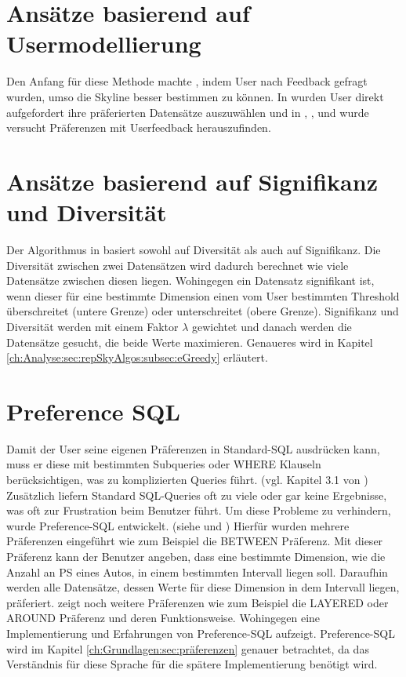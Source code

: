 \section{Ansätze basierend auf Usermodellierung}
\label{ch:Forschungsstand:sec:userModel}
Den Anfang für diese Methode machte \cite{948}, indem User nach Feedback gefragt wurden, umso die Skyline besser bestimmen zu können.
In \cite{Lofi10efficientcomputation} wurden User direkt aufgefordert ihre präferierten Datensätze auszuwählen und in \cite{lee2008optimal}, \cite{Mindolin:2009:DRI:1687627.1687697}, \cite{Mindolin:2011:PEP:1969331.1969354} und \cite{Zhao10callto} wurde versucht Präferenzen mit Userfeedback herauszufinden.
\section{Ansätze basierend auf Signifikanz und Diversität}
\label{ch:Forschungsstand:sec:userModel}
Der Algorithmus in \cite{magnani2014taking} basiert sowohl auf Diversität als auch auf Signifikanz. Die Diversität zwischen zwei Datensätzen wird dadurch berechnet wie viele Datensätze zwischen diesen liegen. Wohingegen ein Datensatz signifikant ist, wenn dieser für eine bestimmte Dimension einen vom User bestimmten Threshold überschreitet (untere Grenze) oder unterschreitet (obere Grenze).
Signifikanz und Diversität werden mit einem Faktor $\lambda$ gewichtet und danach werden die Datensätze gesucht, die beide Werte maximieren. Genaueres wird in Kapitel \ref{ch:Analyse:sec:repSkyAlgos:subsec:eGreedy} erläutert.
\section{Preference SQL}
\label{ch:Forschungsstand:sec:prefSQL}
Damit der User seine eigenen Präferenzen in Standard-SQL ausdrücken kann, muss er diese mit bestimmten Subqueries oder WHERE Klauseln berücksichtigen, was zu komplizierten Queries führt. (vgl. Kapitel 3.1 von \cite{borzsony2001skyline}) Zusätzlich liefern Standard SQL-Queries oft zu viele oder gar keine Ergebnisse, was oft zur Frustration beim Benutzer führt. Um diese Probleme zu verhindern, wurde Preference-SQL entwickelt. (siehe \cite{kiessling2002foundations} und \cite{kiessling2011preference}) Hierfür wurden mehrere Präferenzen eingeführt wie zum Beispiel die BETWEEN Präferenz. Mit dieser Präferenz kann der Benutzer angeben, dass eine bestimmte Dimension, wie die Anzahl an PS eines Autos, in einem bestimmten Intervall liegen soll. Daraufhin werden alle Datensätze, dessen Werte für diese Dimension in dem Intervall liegen, präferiert. \cite{kiessling2002foundations} zeigt noch weitere Präferenzen wie zum Beispiel die LAYERED oder AROUND Präferenz und deren Funktionsweise. Wohingegen \cite{kiessling2002preference} eine Implementierung und Erfahrungen von Preference-SQL aufzeigt. 
Preference-SQL wird im Kapitel \ref{ch:Grundlagen:sec:präferenzen} genauer betrachtet, da das Verständnis für diese Sprache für die spätere Implementierung benötigt wird.
